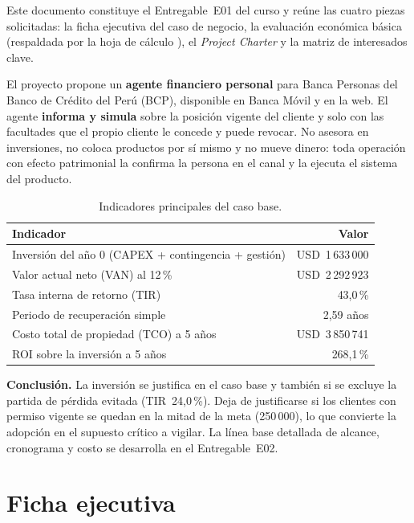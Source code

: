 \documentclass[11pt,a4paper]{article}
\newcommand{\usd}[1]{USD~#1}
\newcommand{\clave}[1]{%
  \par\smallskip\noindent\colorbox{suave}{\parbox{\dimexpr\textwidth-2\fboxsep\relax}{\setstretch{1.15}\small #1}}\par\smallskip}
\begin{document}
Este documento constituye el Entregable~E01 del curso y reúne las cuatro piezas solicitadas: la ficha ejecutiva del caso de negocio, la evaluación económica básica (respaldada por la hoja de cálculo ), el \textit{Project Charter} y la matriz de interesados clave.

El proyecto propone un \textbf{agente financiero personal} para Banca Personas del Banco de Crédito del Perú (BCP), disponible en Banca Móvil y en la web. El agente \textbf{informa y simula} sobre la posición vigente del cliente y solo con las facultades que el propio cliente le concede y puede revocar. No asesora en inversiones, no coloca productos por sí mismo y no mueve dinero: toda operación con efecto patrimonial la confirma la persona en el canal y la ejecuta el sistema del producto.

\begin{table}[H]
\centering
\caption{Indicadores principales del caso base.}
\begin{tabularx}{0.85\textwidth}{@{}X r@{}}
\toprule
\textbf{Indicador} & \textbf{Valor} \\
\midrule
Inversión del año 0 (CAPEX + contingencia + gestión) & \usd{1\,633\,000} \\
Valor actual neto (VAN) al 12\,\% & \usd{2\,292\,923} \\
Tasa interna de retorno (TIR) & 43,0\,\% \\
Periodo de recuperación simple & 2,59 años \\
Costo total de propiedad (TCO) a 5 años & \usd{3\,850\,741} \\
ROI sobre la inversión a 5 años & 268,1\,\% \\
\bottomrule
\end{tabularx}
\end{table}

\clave{\textbf{Conclusión.} La inversión se justifica en el caso base y también si se excluye la partida de pérdida evitada (TIR~24,0\,\%). Deja de justificarse si los clientes con permiso vigente se quedan en la mitad de la meta (250\,000), lo que convierte la adopción en el supuesto crítico a vigilar. La línea base detallada de alcance, cronograma y costo se desarrolla en el Entregable~E02.}

\clearpage
{}

\section{Ficha ejecutiva}\label{sec:ficha}
\end{document}

